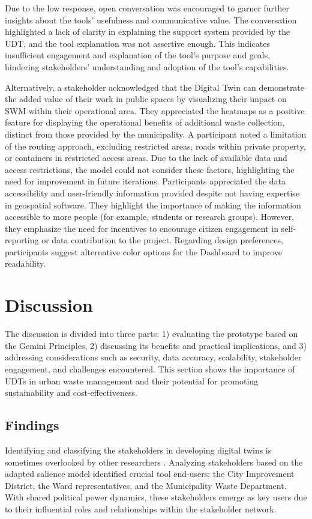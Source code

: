 \documentclass[authoryear,preprint,review,doubleblind, 12pt]{elsarticle}
\begin{document}
    Due to the low response, open conversation was encouraged to garner further insights about the tools' usefulness and communicative value. The conversation highlighted a lack of clarity in explaining the support system provided by the UDT, and the tool explanation was not assertive enough. This indicates insufficient engagement and explanation of the tool's purpose and goals, hindering stakeholders' understanding and adoption of the tool's capabilities.

    Alternatively, a stakeholder acknowledged that the Digital Twin can demonstrate the added value of their work in public spaces by visualizing their impact on SWM within their operational area. They appreciated the heatmaps as a positive feature for displaying the operational benefits of additional waste collection, distinct from those provided by the municipality. A participant noted a limitation of the routing approach, excluding restricted areas, roads within private property, or containers in restricted access areas. Due to the lack of available data and access restrictions, the model could not consider these factors, highlighting the need for improvement in future iterations. Participants appreciated the data accessibility and user-friendly information provided despite not having expertise in geospatial software. They highlight the importance of making the information accessible to more people (for example, students or research groups). However, they emphasize the need for incentives to encourage citizen engagement in self-reporting or data contribution to the project. Regarding design preferences, participants suggest alternative color options for the Dashboard to improve readability.

    \section{Discussion} \label{sec:Discussion}

    The discussion is divided into three parts: 1) evaluating the prototype based on the Gemini Principles, 2) discussing its benefits and practical implications, and 3) addressing considerations such as security, data accuracy, scalability, stakeholder engagement, and challenges encountered. This section shows the importance of UDTs in urban waste management and their potential for promoting sustainability and cost-effectiveness.

    
    \subsection{Findings}\label{subsec:Findings}
    Identifying and classifying the stakeholders in developing digital twins is sometimes overlooked by other researchers \citep{Bartos2021, Jiang2022, Xu2022, Yu2023}. Analyzing stakeholders based on the adapted salience model identified crucial tool end-users: the City Improvement District, the Ward representatives, and the Municipality Waste Department. With shared political power dynamics, these stakeholders emerge as key users due to their influential roles and relationships within the stakeholder network.
\end{document}

